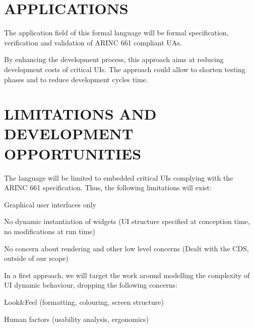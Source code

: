 \documentclass{sigchi}
\newenvironment{packed_itemize}{
\begin{itemize}
  \setlength{\itemsep}{1pt}
  \setlength{\parskip}{0pt}
}{\end{itemize}}
\begin{document}
\section{APPLICATIONS}%
The application field of this formal language will be formal specification, verification and validation of ARINC 661 compliant UAs.

By enhancing the development process, this approach aims at reducing development costs of critical UIs. 
The approach could allow to shorten testing phases and to reduce development cycles time.

\section{LIMITATIONS AND DEVELOPMENT OPPORTUNITIES}%

The language will be limited to embedded critical UIs complying with the ARINC 661 specification. Thus, the following limitations will exist:
\begin{packed_itemize}
\item{Graphical user interfaces only} 
\item{No dynamic instantiation of widgets (UI structure specified at conception time, no modifications at run time)}
\item{No concern about rendering and  other low level concerns (Dealt with the CDS, outside of our scope)}
\end{packed_itemize}

In a first approach, we will target the work around modelling the complexity of UI dynamic behaviour, dropping the following concerns:
\begin{packed_itemize}
\item{Look\&Feel (formatting, colouring, screen structure)} 
\item{Human factors (usability analysis, ergonomics)}
\end{packed_itemize}
\end{document}
